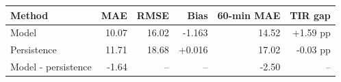 \begin{tabular}{lrrrrr}
\toprule
Method & MAE & RMSE & Bias & 60-min MAE & TIR gap \\
\midrule
Model & 10.07 & 16.02 & -1.163 & 14.52 & +1.59 pp \\
Persistence & 11.71 & 18.68 & +0.016 & 17.02 & -0.03 pp \\
Model - persistence & -1.64 & -- & -- & -2.50 & -- \\
\bottomrule
\end{tabular}
